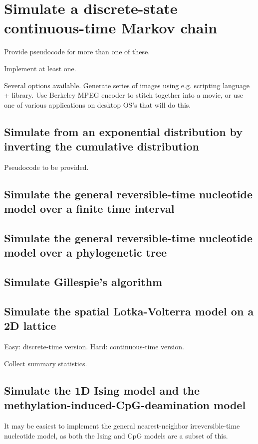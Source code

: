 \chapter{Simulate a discrete-state continuous-time Markov chain}

Provide pseudocode for more than one of these.

Implement at least one.


Several options available.
Generate series of images using e.g. scripting language + library.
Use Berkeley MPEG encoder to stitch together into a movie,
or use one of various applications on desktop OS's that will do this.



\section{Simulate from an exponential distribution by inverting the cumulative distribution}

Pseudocode to be provided.

\section{Simulate the general reversible-time nucleotide model over a finite time interval}

\section{Simulate the general reversible-time nucleotide model over a phylogenetic tree}

\section{Simulate Gillespie's algorithm}

\cite{Gillespie77}

\section{Simulate the spatial Lotka-Volterra model on a 2D lattice}

Easy: discrete-time version.
Hard: continuous-time version.

Collect summary statistics.

\section{Simulate the 1D Ising model and the methylation-induced-CpG-deamination model}

It may be easiest to implement the general nearest-neighbor irreversible-time nucleotide model,
as both the Ising and CpG models are a subset of this.

